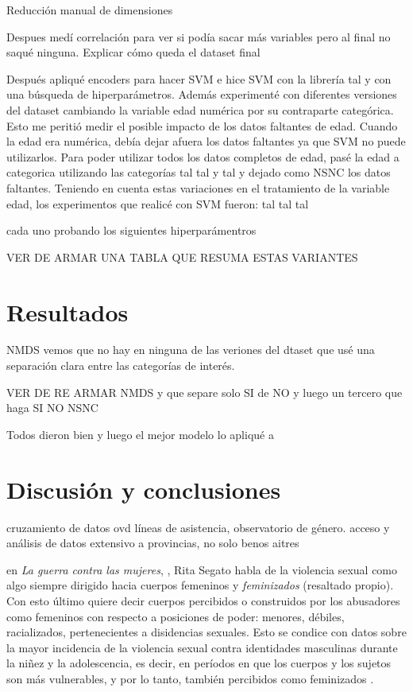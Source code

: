 \documentclass[10 pt]{article}
\begin{document}
Reducción manual de dimensiones


Despues medí correlación para ver si podía sacar más variables pero al final no saqué ninguna. Explicar cómo queda el dataset final

Después apliqué encoders para hacer SVM e hice SVM con la librería tal y con una búsqueda de hiperparámetros. Además experimenté con diferentes versiones del dataset cambiando la variable edad numérica por su contraparte categórica. Esto me peritió medir el posible impacto de los datos faltantes de edad. Cuando la edad era numérica, debía dejar afuera los datos faltantes ya que SVM no puede utilizarlos. Para poder utilizar todos los datos completos de edad, pasé la edad a categorica  utilizando las categorías tal tal y tal y dejado como NSNC los datos faltantes. Teniendo en cuenta estas variaciones en el tratamiento de la variable edad, los experimentos que realicé con SVM fueron: 
tal tal tal

cada uno probando los siguientes hiperparámentros

VER DE ARMAR UNA TABLA QUE RESUMA ESTAS VARIANTES 


\section{Resultados}\label{resultados}
NMDS vemos que no hay en ninguna de las veriones del dtaset que usé una separación clara entre las categorías de interés.

VER DE RE ARMAR NMDS y que separe solo SI de NO y luego un tercero que haga SI NO NSNC

Todos dieron bien y luego el mejor modelo lo apliqué a 

\section{Discusión y conclusiones}\label{conc}
cruzamiento de datos ovd líneas de asistencia, observatorio de género.
acceso y análisis de datos extensivo a provincias, no solo benos aitres



en \textit{La guerra contra las mujeres}, \citeyearpar{segato2016guerra}, Rita Segato habla de la violencia sexual como algo siempre dirigido hacia cuerpos femeninos y \textit{feminizados} (resaltado propio). Con esto último quiere decir cuerpos percibidos o construidos por los abusadores como femeninos con respecto a posiciones de poder: menores, débiles, racializados, pertenecientes a disidencias sexuales. Esto se condice con datos sobre la mayor incidencia de la violencia sexual contra identidades masculinas durante la niñez y la adolescencia, es decir, en períodos en que los cuerpos y los sujetos son más vulnerables, y por lo tanto, también percibidos como feminizados \citep*{contreras2016violencia,ufem_relevamiento,ferris2002world}.
\end{document}
